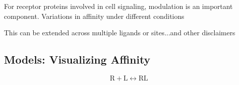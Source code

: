 \documentclass{article}
\numberwithin{equation}{section}
\begin{document}
For receptor proteins involved in cell signaling, modulation is an important component. Variations in affinity under different conditions 



This can be extended across multiple ligands or sites...and other disclaimers

\subsection*{Models: Visualizing Affinity}

\begin{equation}
	\text{R} + \text{L} \leftrightarrow \text{RL}
	\end{equation}
 
\end{document}
